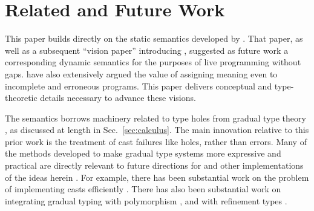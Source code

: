 \vspace{-5px}
\newcommand{\relatedWorkSection}{Related and Future Work}
\section{\protect\relatedWorkSection} %
\label{sec:relatedWork}
\vspace{-2px}

This paper builds directly on the static semantics developed by \citet{popl-paper}. That paper, as well as a subsequent ``vision paper'' introducing \Hazel \cite{HazelnutSNAPL}, suggested as future work  
a corresponding dynamic semantics for the purposes of live programming without gaps. \citet{Bayne:2011:ASD:1985793.1985864} have also extensively argued the value of assigning meaning even to incomplete and erroneous programs. 
This paper delivers conceptual and type-theoretic details necessary to advance these visions.


The semantics borrows machinery related to type holes from gradual type theory \cite{Siek06a,DBLP:conf/snapl/SiekVCB15}, as discussed
at length in Sec.~\ref{sec:calculus}. The main innovation relative to this
prior work is the treatment of cast failures like holes, rather than errors.
Many of the methods developed to make gradual type systems more expressive and practical are directly relevant to future directions for \Hazel and other implementations of the ideas herein \cite{takikawa_et_al:LIPIcs:2015:5215}. For example, there has been substantial work on the problem of implementing casts efficiently \cite{herman2010space,siek2010threesomes,garcia2013threesomes}. There has also been substantial work on integrating gradual typing with polymorphism \cite{DBLP:conf/esop/XieBO18,DBLP:journals/pacmpl/DevriesePP18,Igarashi:2017:PGT:3136534.3110284}, and with refinement types \cite{DBLP:conf/popl/LehmannT17}.


